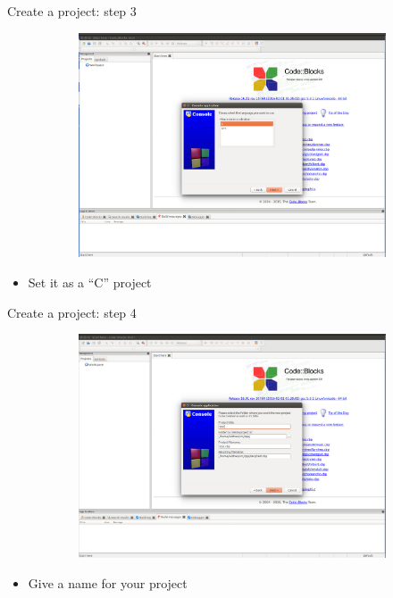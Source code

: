 \begin{frame}{Create a project: step 3}
	\begin{figure}
		\begin{center}
			\begin{figure}
				\includegraphics[width=0.8\linewidth]{figs/cb3.pdf}
			\end{figure}
		\end{center}
	\end{figure}
	\begin{itemize}
		\item {Set it as a ``C'' project}
	\end{itemize}
\end{frame}

\begin{frame}{Create a project: step 4}
	\begin{figure}
		\begin{center}
			\begin{figure}
				\includegraphics[width=0.8\linewidth]{figs/cb4.pdf}
			\end{figure}
		\end{center}
	\end{figure}
	\begin{itemize}
		\item {Give a name for your project}
	\end{itemize}
\end{frame}

